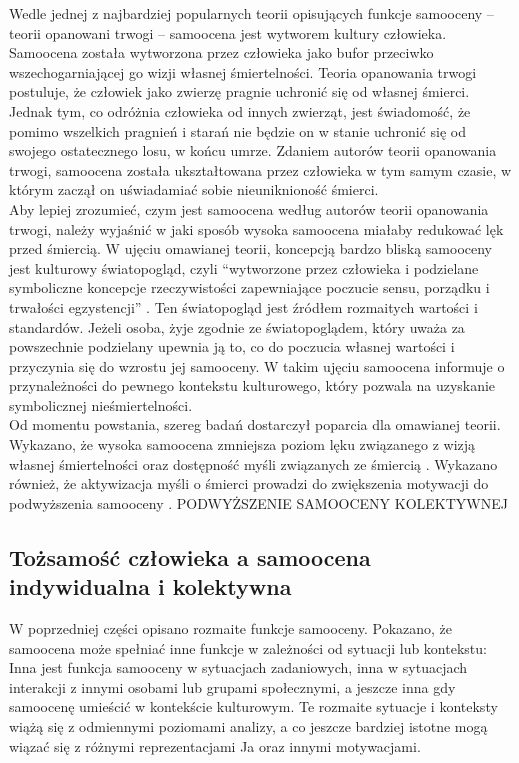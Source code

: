 \documentclass[man]{apa6}
\begin{document}
Wedle jednej z najbardziej popularnych teorii opisujących funkcje samooceny -- teorii opanowani trwogi \parencite{pyszczynski2004people} -- samoocena jest wytworem kultury człowieka. Samoocena została wytworzona przez człowieka jako bufor przeciwko wszechogarniającej go wizji własnej śmiertelności. Teoria opanowania trwogi postuluje, że człowiek jako zwierzę pragnie uchronić się od własnej śmierci. Jednak tym, co odróżnia człowieka od innych zwierząt, jest świadomość, że pomimo wszelkich pragnień i starań nie będzie on w stanie uchronić się od swojego ostatecznego losu, w końcu umrze. Zdaniem autorów teorii opanowania trwogi, samoocena została ukształtowana przez człowieka w tym samym czasie, w którym zaczął on uświadamiać sobie nieuniknioność śmierci.\\

Aby lepiej zrozumieć, czym jest samoocena według autorów teorii opanowania trwogi, należy wyjaśnić w jaki sposób wysoka samoocena miałaby redukować lęk przed śmiercią. W ujęciu omawianej teorii, koncepcją bardzo bliską samooceny jest kulturowy światopogląd, czyli ``wytworzone przez człowieka i podzielane symboliczne koncepcje rzeczywistości zapewniające poczucie sensu, porządku i trwałości egzystencji'' \parencite[][, s. 436]{pyszczynski2004people}. Ten światopogląd jest źródłem rozmaitych wartości i standardów. Jeżeli osoba, żyje zgodnie ze światopoglądem, który uważa za powszechnie podzielany upewnia ją to, co do poczucia własnej wartości i przyczynia się do wzrostu jej samooceny. W takim ujęciu samoocena informuje o przynależności do pewnego kontekstu kulturowego, który pozwala na uzyskanie symbolicznej nieśmiertelności.\\

Od momentu powstania, szereg badań dostarczył poparcia dla omawianej teorii. Wykazano, że wysoka samoocena zmniejsza poziom lęku związanego z wizją własnej śmiertelności \parencite{greenberg1992people} oraz dostępność myśli związanych ze śmiercią \parencite{harmon1997terror}. Wykazano również, że aktywizacja myśli o śmierci prowadzi do zwiększenia motywacji do podwyższenia samooceny \parencite{greenberg1992people}. PODWYŻSZENIE SAMOOCENY KOLEKTYWNEJ

\newpage

\subsection{Tożsamość człowieka a samoocena indywidualna i kolektywna}

W poprzedniej części opisano rozmaite funkcje samooceny. Pokazano, że samoocena może spełniać inne funkcje w zależności od sytuacji lub kontekstu: Inna jest funkcja samooceny w sytuacjach zadaniowych, inna w sytuacjach interakcji z innymi osobami lub grupami społecznymi, a jeszcze inna gdy samoocenę umieścić w kontekście kulturowym. Te rozmaite sytuacje i konteksty wiążą się z odmiennymi poziomami analizy, a co jeszcze bardziej istotne mogą wiązać się z różnymi reprezentacjami Ja \parencite{brewer1996we} oraz innymi motywacjami.\\
\end{document}
